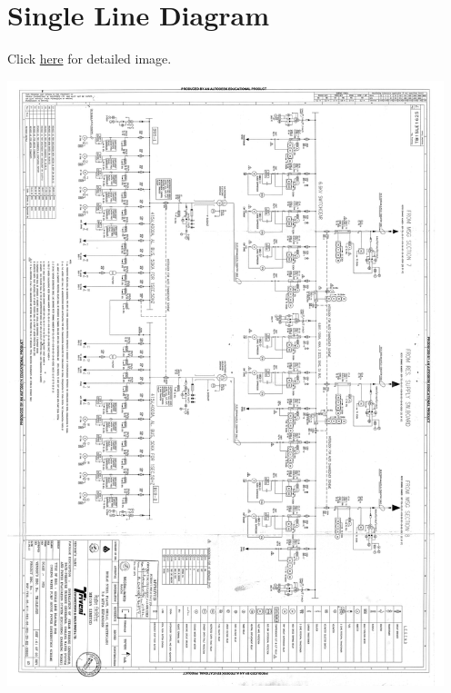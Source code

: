 \documentclass[english,11pt]{report}
\begin{document}
\section{Single Line Diagram}
Click \href{http://i.imgur.com/cnZJrL5.png}{here} for detailed image.\\
\begin{center}
\includegraphics[width = 5in]{cwphsld.png}
\end{center}
\end{document}
